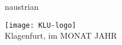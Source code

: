 \begin{otherlanguage*}{naustrian}
\begin{titlepage}
\vspace{7mm}
\begin{center}
	\texttt{[image: KLU-logo]}	\\	
		\vspace{7mm}
	\Large{Klagenfurt, im MONAT JAHR}\\
\end{center}



\end{titlepage}
	
\end{otherlanguage*}
